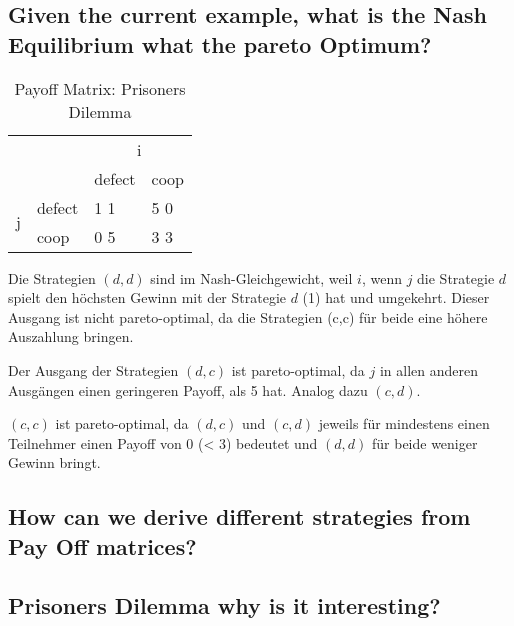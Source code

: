 \subsection{Given the current example, what is the Nash Equilibrium what the pareto Optimum?}
\begin{table}[]
	\centering
	\label{my-label}
	\begin{tabular}{ll|l|l|}
		&        & \multicolumn{2}{c|}{i} \\
		&        & defect      & coop     \\ \hline
		\multirow{2}{*}{j} & defect & 1 1         & 5 0      \\ \cline{2-4} 
		& coop   & 0 5         & 3 3      \\ \hline
	\end{tabular}
	\caption{Payoff Matrix: Prisoners Dilemma}
\end{table}
Die Strategien $(d,d)$ sind im Nash-Gleichgewicht, weil $i$, wenn $j$ die Strategie $d$ spielt den höchsten Gewinn mit der Strategie $d$ (1) hat und umgekehrt.
Dieser Ausgang ist nicht pareto-optimal, da die Strategien (c,c) für beide eine höhere Auszahlung bringen.

Der Ausgang der Strategien $(d,c)$ ist pareto-optimal, da $j$ in allen anderen Ausgängen einen geringeren Payoff, als 5 hat. Analog dazu $(c,d)$.

$(c,c)$ ist pareto-optimal, da $(d,c)$ und $(c,d)$ jeweils für mindestens einen Teilnehmer einen Payoff von 0 (< 3) bedeutet und $(d,d)$ für beide weniger Gewinn bringt.
\subsection{How can we derive different strategies from Pay Off matrices?}

\subsection{Prisoners Dilemma why is it interesting?}
